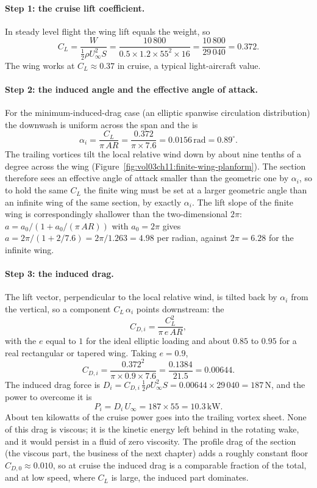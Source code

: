 \paragraph{Step 1: the cruise lift coefficient.} In steady level
flight the wing lift equals the weight, so
\[
C_L = \frac{W}{\tfrac12\rho U_\infty^2 S}
= \frac{10\,800}{0.5\times 1.2\times 55^2\times 16}
= \frac{10\,800}{29\,040}
= 0.372.
\]
The wing works at $C_L \approx 0.37$ in cruise, a typical light-aircraft
value.

\paragraph{Step 2: the induced angle and the effective angle of
attack.} For the minimum-induced-drag case (an elliptic spanwise
circulation distribution) the downwash is uniform across the span and
the  is
\[
\alpha_i = \frac{C_L}{\pi\,AR}
= \frac{0.372}{\pi\times 7.6}
= 0.0156\,\text{rad}
= 0.89^\circ.
\]
The trailing vortices tilt the local relative wind down by about nine
tenths of a degree across the wing
(Figure~\ref{fig:vol03ch11:finite-wing-planform}). The section
therefore sees an effective angle of attack smaller than the geometric
one by $\alpha_i$, so to hold the same $C_L$ the finite wing must be
set at a larger geometric angle than an infinite wing of the same
section, by exactly $\alpha_i$. The lift slope of the finite wing is
correspondingly shallower than the two-dimensional $2\pi$: $a =
a_0/(1 + a_0/(\pi\,AR))$ with $a_0 = 2\pi$ gives $a = 2\pi/(1 +
2/7.6) = 2\pi/1.263 = 4.98$ per radian, against $2\pi = 6.28$ for the
infinite wing.

\paragraph{Step 3: the induced drag.} The lift vector, perpendicular
to the local relative wind, is tilted back by $\alpha_i$ from the
vertical, so a component $C_L\,\alpha_i$ points downstream: the
\[
C_{D,i} = \frac{C_L^2}{\pi\,e\,AR},
\]
with the  $e$ equal to $1$ for the
ideal elliptic loading and about $0.85$ to $0.95$ for a real
rectangular or tapered wing. Taking $e = 0.9$,
\[
C_{D,i} = \frac{0.372^2}{\pi\times 0.9\times 7.6}
= \frac{0.1384}{21.5}
= 0.00644.
\]
The induced drag force is $D_i = C_{D,i}\,\tfrac12\rho U_\infty^2 S =
0.00644\times 29\,040 = 187\,\si{\newton}$, and the power to overcome
it is
\[
P_i = D_i\,U_\infty = 187\times 55 = 10.3\,\text{kW}.
\]
About ten kilowatts of the cruise power goes into the trailing vortex
sheet. None of this drag is viscous; it is the kinetic energy left
behind in the rotating wake, and it would persist in a fluid of zero
viscosity. The profile drag of the section (the viscous part, the
business of the next chapter) adds a roughly constant floor
$C_{D,0}\approx 0.010$, so at cruise the induced drag is a comparable
fraction of the total, and at low speed, where $C_L$ is large, the
induced part dominates.

